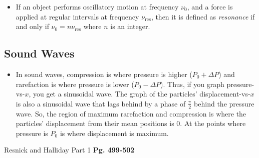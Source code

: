 \documentclass{scrartcl}
\begin{document}
\begin{itemize}
        \item If an object performs oscillatory motion at frequency $\nu_0$, and a force is applied at regular intervals at frequency $\nu_\text{res}$, then it is defined as \textit{resonance} if and only if $\nu_0=n\nu_\text{res}$ where $n$ is an integer.
    \end{itemize}
    \subsection{Sound Waves}
    \begin{itemize}
        \item In sound waves, compression is where pressure is higher ($P_0+\Delta P$) and rarefaction is where pressure is lower ($P_0-\Delta P$). Thus, if you graph pressure-vs-$x$, you get a sinusoidal wave. The graph of the particles' displacement-vs-$x$ is also a sinusoidal wave that lags behind by a phase of $\frac\pi2$ behind the pressure wave. So, the region of maximum rarefaction and compression is where the particles' displacement from their mean positions is 0. At the points where pressure is $P_0$ is where displacement is maximum.
    \end{itemize}
    Resnick and Halliday Part 1 \textbf{Pg. 499-502}
\end{document}
